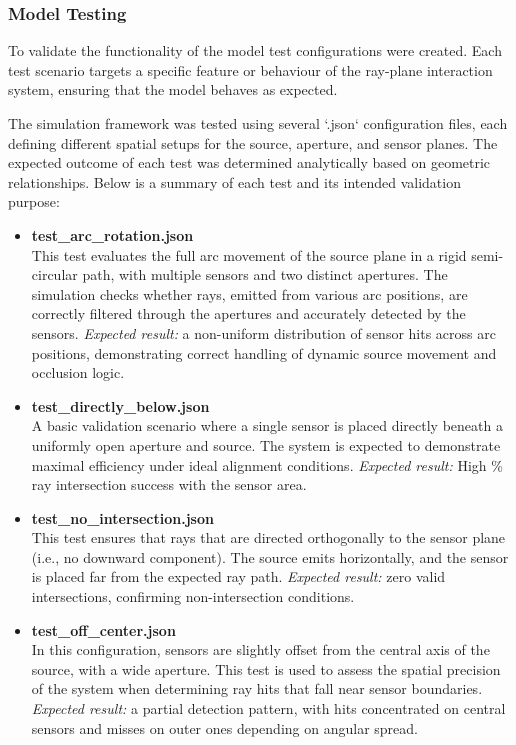 \subsubsection{Model Testing}
To validate the functionality of the model test configurations were created. Each test scenario targets a specific feature or behaviour of the ray-plane interaction system, ensuring that the model behaves as expected.

The simulation framework was tested using several `.json` configuration files, each defining different spatial setups for the source, aperture, and sensor planes. The expected outcome of each test was determined analytically based on geometric relationships. Below is a summary of each test and its intended validation purpose:

\begin{itemize}
    \item \textbf{test\_arc\_rotation.json} \\
    This test evaluates the full arc movement of the source plane in a rigid semi-circular path, with multiple sensors and two distinct apertures. The simulation checks whether rays, emitted from various arc positions, are correctly filtered through the apertures and accurately detected by the sensors. \textit{Expected result:} a non-uniform distribution of sensor hits across arc positions, demonstrating correct handling of dynamic source movement and occlusion logic.
    
    \item \textbf{test\_directly\_below.json} \\
    A basic validation scenario where a single sensor is placed directly beneath a uniformly open aperture and source. The system is expected to demonstrate maximal efficiency under ideal alignment conditions. \textit{Expected result:} High \% ray intersection success with the sensor area.

    \item \textbf{test\_no\_intersection.json} \\
    This test ensures that rays that are directed orthogonally to the sensor plane (i.e., no downward component). The source emits horizontally, and the sensor is placed far from the expected ray path. \textit{Expected result:} zero valid intersections, confirming non-intersection conditions.

    \item \textbf{test\_off\_center.json} \\
    In this configuration, sensors are slightly offset from the central axis of the source, with a wide aperture. This test is used to assess the spatial precision of the system when determining ray hits that fall near sensor boundaries. \textit{Expected result:} a partial detection pattern, with hits concentrated on central sensors and misses on outer ones depending on angular spread.


\end{itemize}
